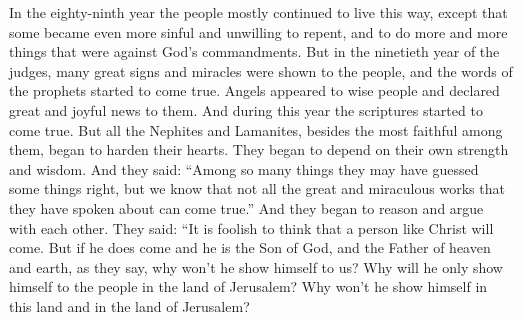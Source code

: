 In the eighty-ninth year the people mostly continued to live this way, except that some became even more sinful and unwilling to repent, and to do more and more things that were against God's commandments.
\bverse \iffalse But it came to pass in the ninetieth year of the reign of the judges, there were great signs given unto the people, and wonders; and the words of the prophets began to be fulfilled. \fi
But in the ninetieth year of the judges, many great signs and miracles were shown to the people, and the words of the prophets started to come true.
\bverse \iffalse And angels did appear unto men, wise men, and did declare unto them glad tidings of great joy; thus in this year the scriptures began to be fulfilled. \fi
Angels appeared to wise people and declared great and joyful news to them. And during this year the scriptures started to come true.
\bverse \iffalse Nevertheless, the people began to harden their hearts, all save it were the most believing part of them, both of the Nephites and also of the Lamanites, and began to depend upon their own strength and upon their own wisdom, saying: \fi
But all the Nephites and Lamanites, besides the most faithful among them, began to harden their hearts. They began to depend on their own strength and wisdom. And they said: 
\bverse \iffalse Some things they may have guessed right, among so many; but behold, we know that all these great and marvelous works cannot come to pass, of which has been spoken. \fi
``Among so many things they may have guessed some things right, but we know that not all the great and miraculous works that they have spoken about can come true.''
\bverse \iffalse And they began to reason and to contend among themselves, saying: \fi
And they began to reason and argue with each other. They said: 
\bverse \iffalse That it is not reasonable that such a being as a Christ shall come; if so, and he be the Son of God, the Father of heaven and of earth, as it has been spoken, why will he not show himself unto us as well as unto them who shall be at Jerusalem? \fi
``It is foolish to think that a person like Christ will come. But if he does come and he is the Son of God, and the Father of heaven and earth, as they say, why won't he show himself to us? Why will he only show himself to the people in the land of Jerusalem?
\bverse \iffalse Yea, why will he not show himself in this land as well as in the land of Jerusalem? \fi
Why won't he show himself in this land and in the land of Jerusalem?

